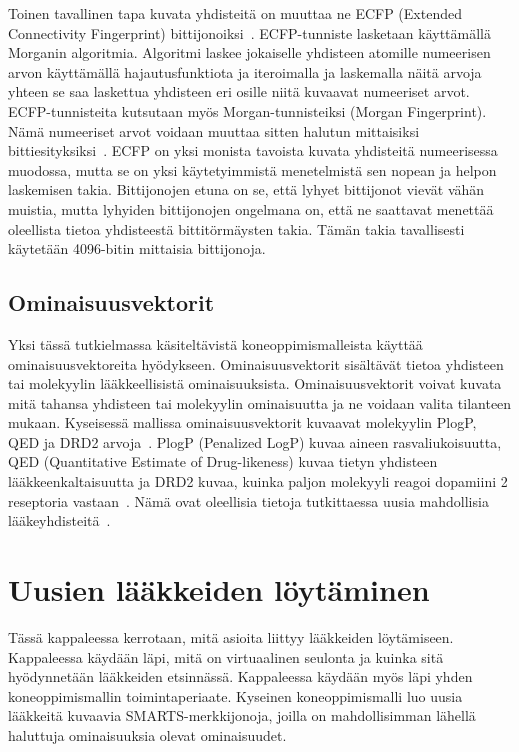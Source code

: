 \documentclass[finnish,twoside,censored,tkt,sw-line]{HYthesisML}
\begin{document}
Toinen tavallinen tapa kuvata yhdisteitä on muuttaa ne ECFP (Extended Connectivity Fingerprint) bittijonoiksi~\cite{RogersDavid2010EF}.
ECFP-tunniste lasketaan käyttämällä Morganin algoritmia.
Algoritmi laskee jokaiselle yhdisteen atomille numeerisen arvon käyttämällä hajautusfunktiota ja iteroimalla ja laskemalla näitä arvoja yhteen se saa laskettua yhdisteen eri osille niitä kuvaavat numeeriset arvot.
ECFP-tunnisteita kutsutaan myös Morgan-tunnisteiksi (Morgan Fingerprint).
Nämä numeeriset arvot voidaan muuttaa sitten halutun mittaisiksi bittiesityksiksi~\cite{RogersDavid2010EF}.
ECFP on yksi monista tavoista kuvata yhdisteitä numeerisessa muodossa, mutta se on yksi käytetyimmistä menetelmistä sen nopean ja helpon laskemisen takia.
Bittijonojen etuna on se, että lyhyet bittijonot vievät vähän muistia, mutta lyhyiden bittijonojen ongelmana on, että ne saattavat menettää oleellista tietoa yhdisteestä bittitörmäysten takia.
Tämän takia tavallisesti käytetään 4096-bitin mittaisia bittijonoja.

\section{Ominaisuusvektorit}

Yksi tässä tutkielmassa käsiteltävistä koneoppimismalleista käyttää ominaisuusvektoreita hyödykseen.
Ominaisuusvektorit sisältävät tietoa yhdisteen tai molekyylin lääkkeellisistä ominaisuuksista.
Ominaisuusvektorit voivat kuvata mitä tahansa yhdisteen tai molekyylin ominaisuutta ja ne voidaan valita tilanteen mukaan.
Kyseisessä mallissa ominaisuusvektorit kuvaavat molekyylin PlogP, QED ja DRD2 arvoja~\cite{ShinBonggun}.
PlogP (Penalized LogP) kuvaa aineen rasvaliukoisuutta, QED (Quantitative Estimate of Drug-likeness) kuvaa tietyn yhdisteen lääkkeenkaltaisuutta ja DRD2 kuvaa, kuinka paljon molekyyli reagoi dopamiini 2 reseptoria vastaan~\cite{BickertonGRichard2012Qtcb}.
Nämä ovat oleellisia tietoja tutkittaessa uusia mahdollisia lääkeyhdisteitä~\cite{ShinBonggun}.

\chapter{Uusien lääkkeiden löytäminen}

Tässä kappaleessa kerrotaan, mitä asioita liittyy lääkkeiden löytämiseen.
Kappaleessa käydään läpi, mitä on virtuaalinen seulonta ja kuinka sitä hyödynnetään lääkkeiden etsinnässä.
Kappaleessa käydään myös läpi yhden koneoppimismallin toimintaperiaate.
Kyseinen koneoppimismalli luo uusia lääkkeitä kuvaavia SMARTS-merkkijonoja, joilla on mahdollisimman lähellä haluttuja ominaisuuksia olevat ominaisuudet.
\end{document}
